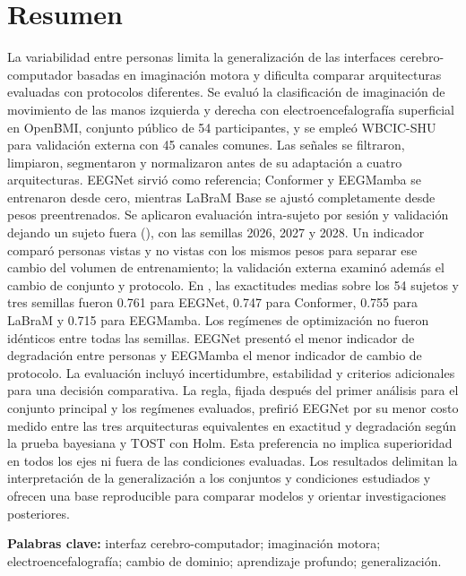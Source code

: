 \chapter*{Resumen}
La variabilidad entre personas limita la generalización de las interfaces cerebro-computador basadas en imaginación motora y dificulta comparar arquitecturas evaluadas con protocolos diferentes. Se evaluó la clasificación de imaginación de movimiento de las manos izquierda y derecha con electroencefalografía superficial en OpenBMI, conjunto público de 54 participantes, y se empleó WBCIC-SHU para validación externa con 45 canales comunes. Las señales se filtraron, limpiaron, segmentaron y normalizaron antes de su adaptación a cuatro arquitecturas. EEGNet sirvió como referencia; Conformer y EEGMamba se entrenaron desde cero, mientras LaBraM Base se ajustó completamente desde pesos preentrenados. Se aplicaron evaluación intra-sujeto por sesión y validación dejando un sujeto fuera (\loso{}), con las semillas 2026, 2027 y 2028. Un indicador comparó personas vistas y no vistas con los mismos pesos para separar ese cambio del volumen de entrenamiento; la validación externa examinó además el cambio de conjunto y protocolo. En \loso{}, las exactitudes medias sobre los 54 sujetos y tres semillas fueron 0.761 para EEGNet, 0.747 para Conformer, 0.755 para LaBraM y 0.715 para EEGMamba. Los regímenes de optimización no fueron idénticos entre todas las semillas. EEGNet presentó el menor indicador de degradación entre personas y EEGMamba el menor indicador de cambio de protocolo. La evaluación incluyó incertidumbre, estabilidad y criterios adicionales para una decisión comparativa. La regla, fijada después del primer análisis para el conjunto principal y los regímenes evaluados, prefirió EEGNet por su menor costo medido entre las tres arquitecturas equivalentes en exactitud \loso{} y degradación según la prueba bayesiana y TOST con Holm. Esta preferencia no implica superioridad en todos los ejes ni fuera de las condiciones evaluadas. Los resultados delimitan la interpretación de la generalización a los conjuntos y condiciones estudiados y ofrecen una base reproducible para comparar modelos y orientar investigaciones posteriores.

\noindent\textbf{Palabras clave:} interfaz cerebro-computador; imaginación motora; electroencefalografía; cambio de dominio; aprendizaje profundo; generalización.
